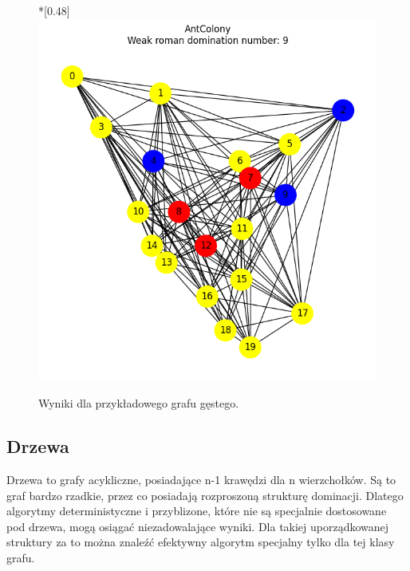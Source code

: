 \begin{figure}[htbp]
        \hfill
        \begin{subcaptionbox}*{}[0.48\linewidth]
            {\includegraphics[width=0.75\linewidth]{assets/plots/AntColony/ErdosRenyi_dense_n20_i2_results.png}}
        \end{subcaptionbox}
    
        \caption{Wyniki dla przykładowego grafu gęstego.}
        \label{fig:dense}
    \end{figure}

\subsection{Drzewa}

Drzewa to grafy acykliczne, posiadające n-1 krawędzi dla n wierzchołków. Są to graf bardzo rzadkie, przez co posiadają rozproszoną strukturę dominacji. Dlatego algorytmy deterministyczne i przyblizone, które nie są specjalnie dostosowane pod drzewa, mogą osiągać niezadowalające wyniki. Dla takiej uporządkowanej struktury za to można znaleźć efektywny algorytm specjalny tylko dla tej klasy grafu.

